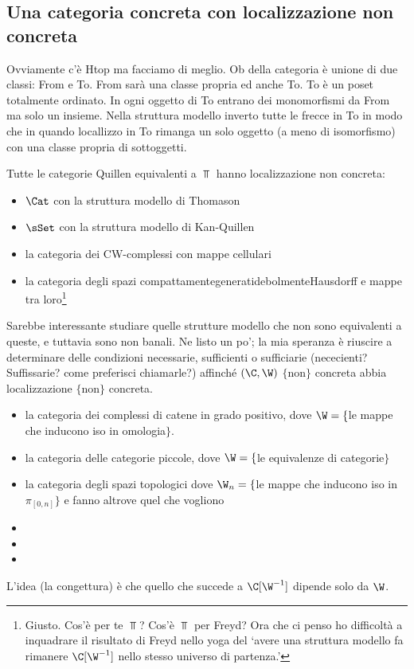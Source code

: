 \documentclass[10pt,a4paper]{amsart}
\begin{document}
\subsection{Una categoria concreta con localizzazione non concreta}
Ovviamente c'è Htop ma facciamo di meglio.  Ob della categoria è unione di due classi: From e To. From sarà una classe propria ed anche To. To è un poset totalmente ordinato. In ogni oggetto di To entrano dei monomorfismi da From ma solo un insieme. Nella struttura modello inverto tutte le frecce in To in modo che in quando locallizzo in To rimanga un solo oggetto (a meno di isomorfismo) con una classe propria di sottoggetti.


Tutte le categorie Quillen equivalenti a $\Top$ hanno localizzazione non concreta:
\begin{itemize}
\item $\Cat$ con la struttura modello di Thomason
\item $\sSet$ con la struttura modello di Kan-Quillen
\item la categoria dei CW-complessi con mappe cellulari
\item la categoria degli spazi compattamentegeneratidebolmenteHausdorff e mappe tra loro\footnote{Giusto. Cos'è per te $\Top$? Cos'è $\Top$ per Freyd? Ora che ci penso ho difficoltà a inquadrare il risultato di Freyd nello yoga del `avere una struttura modello fa rimanere $\C[\W^{-1}]$ nello stesso universo di partenza.'}
\end{itemize} 
Sarebbe interessante studiare quelle strutture modello che non sono equivalenti a queste, e tuttavia sono non banali. Ne listo un po'; la mia speranza è riuscire a determinare delle condizioni necessarie, sufficienti o sufficiarie (nececienti? Suffissarie? come preferisci chiamarle?) affinché $(\C, \W)$ $\{$non$\}$ concreta abbia localizzazione $\{$non$\}$ concreta.
\begin{itemize}
\item la categoria dei complessi di catene in grado positivo, dove $\W = \{$le mappe che inducono iso in omologia$\}$.
\item la categoria delle categorie piccole, dove $\W=\{$le equivalenze di categorie$\}$
\item la categoria degli spazi topologici dove $\W_n = \{$le mappe che inducono iso in $\pi_{[0,n]}\}$ e fanno altrove quel che vogliono
\item 
\item 
\item 
\end{itemize}
L'idea (la congettura) è che quello che succede a $\C[\W^{-1}]$ dipende solo da $\W$.
\end{document}

